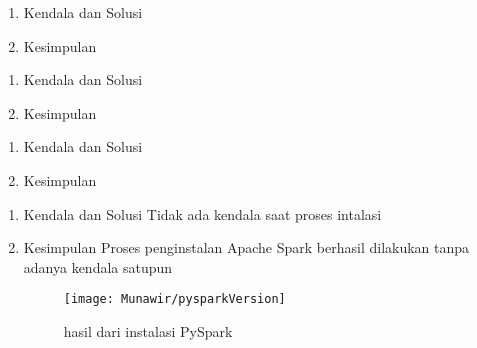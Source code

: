 \begin{enumerate}
\item Kendala dan Solusi

\item Kesimpulan

\end{enumerate}

\begin{enumerate}
\item Kendala dan Solusi

\item Kesimpulan

\end{enumerate}

\begin{enumerate}
\item Kendala dan Solusi

\item Kesimpulan

\end{enumerate}

\begin{enumerate}
\item Kendala dan Solusi
Tidak ada kendala saat proses intalasi

\item Kesimpulan
Proses penginstalan Apache Spark berhasil dilakukan tanpa
adanya kendala satupun

\begin{figure}[!ht]
    \texttt{[image: Munawir/pysparkVersion]}
    \caption{hasil dari instalasi PySpark}
    \label{gam:perkuliahan-25-11}
    \end{figure}

\end{enumerate}